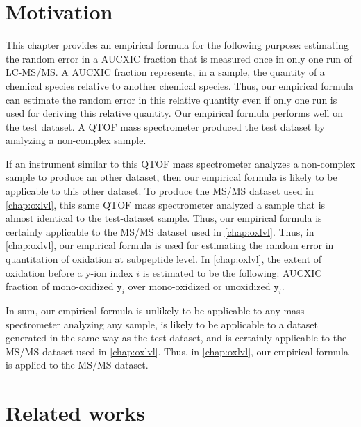 \section{Motivation}
\label{sec:error:motivation}

This chapter provides an empirical formula for the following purpose: 
	estimating the random error in a \gls{AUCXIC} fraction that is measured once in only one run of \gls{LC-MS/MS}.
A \gls{AUCXIC} fraction represents, in a sample, the quantity of a chemical species relative to another chemical species.
Thus, our empirical formula can estimate the random error in this relative quantity even if only one run is used for deriving this relative quantity.
Our empirical formula performs well on the test dataset.
A \gls{QTOF} mass spectrometer produced the test dataset by analyzing a non-complex sample.

If an instrument similar to this \gls{QTOF} mass spectrometer analyzes a non-complex sample to produce an other dataset, 
	then our empirical formula is likely to be applicable to this other dataset.
To produce the \gls{MS/MS} dataset used in \cref{chap:oxlvl}, 
	this same \gls{QTOF} mass spectrometer analyzed a sample that is almost identical to the test-dataset sample.
Thus, our empirical formula is certainly applicable to the \gls{MS/MS} dataset used in \cref{chap:oxlvl}.{}
Thus, in \cref{chap:oxlvl}, our empirical formula is used for estimating the random error in quantitation of oxidation at subpeptide level. 
In \cref{chap:oxlvl}, the extent of oxidation before a y-ion index \(i\) is estimated to be the following:
	\gls{AUCXIC} fraction of \gls{mono-oxidized} \(\texttt{y}_i\) over \gls{mono-oxidized} or unoxidized \(\texttt{y}_i\).
	
In sum,
	our empirical formula is unlikely to be applicable to any mass spectrometer analyzing any sample,
	is likely to be applicable to a dataset generated in the same way as the test dataset,
	and is certainly applicable to the \gls{MS/MS} dataset used in \cref{chap:oxlvl}.
Thus, in \cref{chap:oxlvl}, our empirical formula is applied to the \gls{MS/MS} dataset.
	
\def\ratioAUCXIC{\displaystyle\frac{\gls{AUCXIC}(P_1)}{\gls{AUCXIC}(P_1)+\gls{AUCXIC}(P_2)}}		
\def\ratioAUCXIC{\phi(P_1, P_2)}	
		
\section{Related works}

